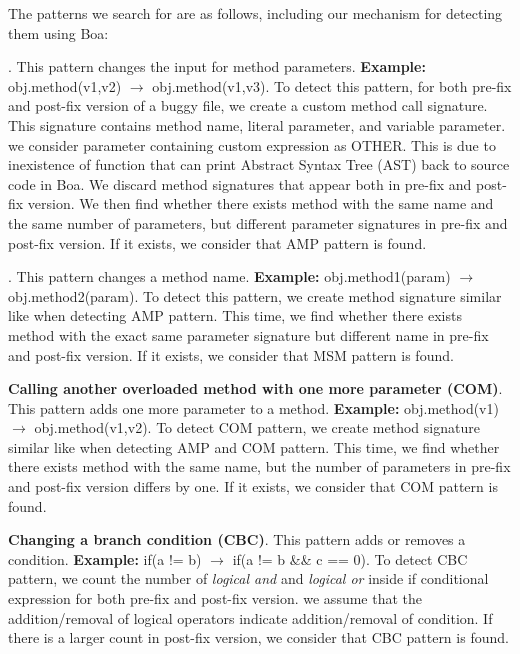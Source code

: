 \documentclass{sig-alternate-05-2015}
\begin{document}
The patterns we search for are as follows, including our mechanism for
detecting them using Boa:

\vspace{1ex}
.  This pattern changes the
input for method parameters.  {\bf Example:} obj.method(v1,v2) $\rightarrow$
obj.method(v1,v3). To detect this pattern, for both pre-fix and post-fix version
of a buggy file, we create a custom method call signature. This signature
contains method name, literal parameter, and variable parameter. we consider
parameter containing custom expression as OTHER. This is due to inexistence of
function that can print Abstract Syntax Tree (AST) back to source code in
Boa. We discard method signatures that appear both in pre-fix and post-fix
version. We then find whether there exists method with the same name and the
same number of parameters, but different parameter signatures in pre-fix and
post-fix version. If it exists, we consider that AMP pattern is found.

\vspace{1ex}
.  This
pattern changes a method name.  {\bf Example:} obj.method1(param) $\rightarrow$
obj.method2(param).  To detect this pattern, we create method signature similar
like when detecting AMP pattern. This time, we find whether there exists method
with the exact same parameter signature but different name in pre-fix and
post-fix version. If it exists, we consider that MSM pattern is found.

\vspace{1ex}
\noindent
{\bf Calling another overloaded method with one more parameter (COM)}. This
pattern adds one more parameter to a method. 
	{\bf Example:} obj.method(v1) $\rightarrow$ obj.method(v1,v2).
  To detect COM pattern, we create method signature similar like when detecting
  AMP and COM pattern. This time, we find whether there exists method with
  the same name, but the number of parameters in pre-fix and post-fix version
  differs by one. If it exists, we consider that COM pattern is found.

\vspace{1ex}
\noindent
 {\bf Changing a branch condition (CBC)}. This pattern adds or removes a condition.
	{\bf Example:} if(a != b) $\rightarrow$ if(a != b \&\& c == 0).
  To detect CBC pattern, we count the number of { \em logical and} and {\em
    logical or} inside if conditional expression for both pre-fix and post-fix
  version. we assume that the addition/removal of logical operators indicate
  addition/removal of condition. If there is a larger count in post-fix version, we consider that CBC pattern is found.
\end{document}
